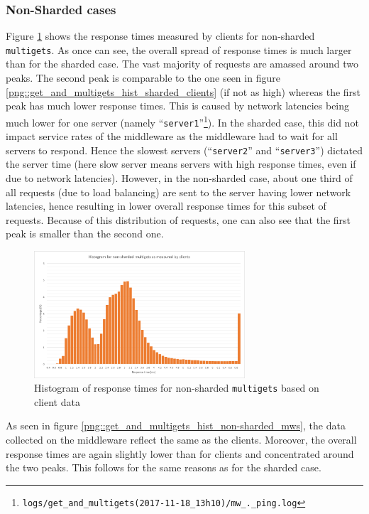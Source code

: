 \documentclass[11pt,a4paper]{article}
\begin{document}
\subsubsection{Non-Sharded cases}
Figure \ref{png::get_and_multigets_hist_non-sharded_clients} shows the response times measured by clients for non-sharded \texttt{multigets}. As once can see, the overall spread of response times is much larger than for the sharded case. The vast majority of requests are amassed around two peaks. The second peak is comparable to the one seen in figure \ref{png::get_and_multigets_hist_sharded_clients} (if not as high) whereas the first peak has much lower response times. This is caused by network latencies being much lower for one server (namely ``\texttt{server1}''\footnote{\texttt{logs/get_and_multigets(2017-11-18_13h10)/mw_._ping.log}}). In the sharded case, this did not impact service rates of the middleware as the middleware had to wait for all servers to respond. Hence the slowest servers (``\texttt{server2}'' and ``\texttt{server3}'') dictated the server time (here slow server means servers with high response times, even if due to network latencies). However, in the non-sharded case, about one third of all requests (due to load balancing) are sent to the server having lower network latencies, hence resulting in lower overall response times for this subset of requests. Because of this distribution of requests, one can also see that the first peak is smaller than the second one.

\begin{figure}[!h]
    \centering
    \includegraphics[width=0.7\textwidth]{processing/graphics/get_and_multigets_hist_non-sharded_clients.png}
    \caption{Histogram of response times for non-sharded \texttt{multigets} based on client data}
    \label{png::get_and_multigets_hist_non-sharded_clients}
\end{figure}

As seen in figure \ref{png::get_and_multigets_hist_non-sharded_mws}, the data collected on the middleware reflect the same as the clients. Moreover, the overall response times are again slightly lower than for clients and concentrated around the two peaks. This follows for the same reasons as for the sharded case.
\end{document}
